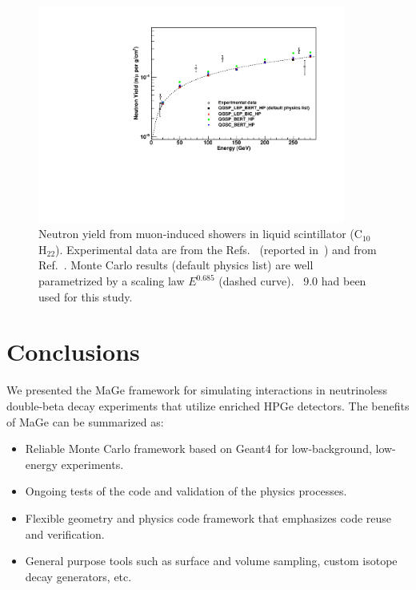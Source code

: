\documentclass[article]{IEEEtran}
\begin{document}
%
\begin{figure}[tbh]
\centering
\includegraphics[width=0.90\textwidth]{plots/scintillator_vs_data.pdf}
\caption{Neutron yield from muon-induced showers in liquid scintillator (C$_{10}$H$_{22}$). 
Experimental data are from the Refs.~\cite{mudata} (reported 
in~\cite{Araujo:05}) and from Ref.~\cite{kamlanddata}. 
Monte Carlo results 
(default physics list) are well parametrized by a scaling law $E^{0.685}$ 
(dashed curve). \GF\ 9.0 had been used for this study.}\label{fig:scintillator_vs_data} 
\end{figure}
%


\section{Conclusions}
\label{section:conclusions} 


We presented the {\sc MaGe} framework for simulating interactions in
neutrinoless double-beta decay experiments that utilize enriched HPGe
detectors. The benefits of {\sc MaGe} can be summarized as:
\begin{itemize}
\item Reliable Monte Carlo framework based on {\sc Geant4} for
low-background, low-energy experiments.
\item Ongoing tests of the code and validation of the physics processes. 
\item Flexible geometry and physics code framework that emphasizes code
reuse and verification. 
\item General purpose tools such as surface 
and volume sampling, custom isotope decay generators, etc.
\end{itemize} 
\end{document}

